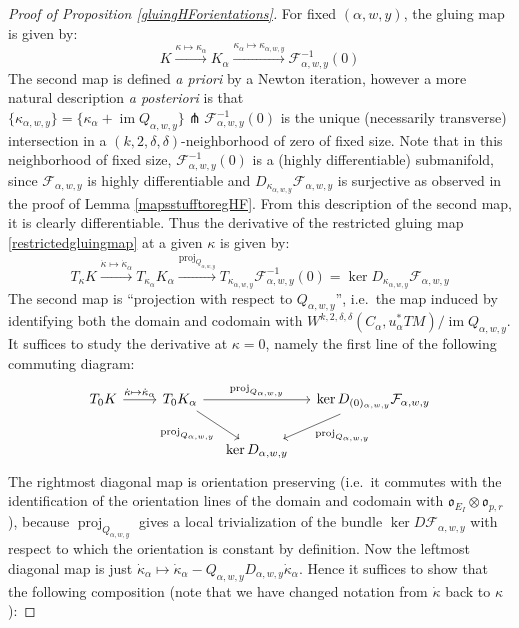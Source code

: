 \documentclass[12pt]{article}
\theoremstyle{definition}
\theoremstyle{remark}
\numberwithin{equation}{subsection}
\newcommand{\F}{\mathcal F}
\newcommand{\oo}{\mathfrak o}
\newcommand{\proj}{\operatorname{proj}}
\newcommand{\im}{\operatorname{im}}
\begin{document}
\begin{proof}[Proof of Proposition \ref{gluingHForientations}]
For fixed $(\alpha,w,y)$, the gluing map is given by:
\begin{equation}\label{restrictedgluingmap}
K\xrightarrow{\kappa\mapsto\kappa_\alpha}K_\alpha\xrightarrow{\kappa_\alpha\mapsto\kappa_{\alpha,w,y}}\F_{\alpha,w,y}^{-1}(0)
\end{equation}
The second map is defined \emph{a priori} by a Newton iteration, however a more natural description \emph{a posteriori} is that $\{\kappa_{\alpha,w,y}\}=\{\kappa_\alpha+\im Q_{\alpha,w,y}\}\pitchfork\F_{\alpha,w,y}^{-1}(0)$ is the unique (necessarily transverse) intersection in a $(k,2,\delta,\delta)$-neighborhood of zero of fixed size.  Note that in this neighborhood of fixed size, $\F_{\alpha,w,y}^{-1}(0)$ is a (highly differentiable) submanifold, since $\F_{\alpha,w,y}$ is highly differentiable and $D_{\kappa_{\alpha,w,y}}\F_{\alpha,w,y}$ is surjective as observed in the proof of Lemma \ref{mapsstufftoregHF}.  From this description of the second map, it is clearly differentiable.  Thus the derivative of the restricted gluing map \eqref{restrictedgluingmap} at a given $\kappa$ is given by:
\begin{equation}
T_\kappa K\xrightarrow{\dot\kappa\mapsto\dot\kappa_\alpha}T_{\kappa_\alpha}K_\alpha\xrightarrow{\proj_{Q_{\alpha,w,y}}}T_{\kappa_{\alpha,w,y}}\F_{\alpha,w,y}^{-1}(0)=\ker D_{\kappa_{\alpha,w,y}}\F_{\alpha,w,y}
\end{equation}
The second map is ``projection with respect to $Q_{\alpha,w,y}$'', i.e.\ the map induced by identifying both the domain and codomain with $W^{k,2,\delta,\delta}(C_\alpha,u_\alpha^\ast TM)/\im Q_{\alpha,w,y}$.  It suffices to study the derivative at $\kappa=0$, namely the first line of the following commuting diagram:
\begin{equation}
\begin{tikzcd}[column sep = small]
T_0K\ar{rr}{\dot\kappa\mapsto\dot\kappa_\alpha}&&T_0K_\alpha\ar{rr}{\proj_{Q_{\alpha,w,y}}}\ar{dr}[swap]{\proj_{Q_{\alpha,w,y}}}&&\ker D_{(0)_{\alpha,w,y}}\F_{\alpha,w,y}\ar{dl}{\proj_{Q_{\alpha,w,y}}}\\
&&&\ker D_{\alpha,w,y}
\end{tikzcd}
\end{equation}
The rightmost diagonal map is orientation preserving (i.e.\ it commutes with the identification of the orientation lines of the domain and codomain with $\oo_{E_I}\otimes\oo_{p,r}$), because $\proj_{Q_{\alpha,w,y}}$ gives a local trivialization of the bundle $\ker D\F_{\alpha,w,y}$ with respect to which the orientation is constant by definition.  Now the leftmost diagonal map is just $\dot\kappa_\alpha\mapsto\dot\kappa_\alpha-Q_{\alpha,w,y}D_{\alpha,w,y}\dot\kappa_\alpha$.  Hence it suffices to show that the following composition (note that we have changed notation from $\dot\kappa$ back to $\kappa$):

\end{proof}
\end{document}
